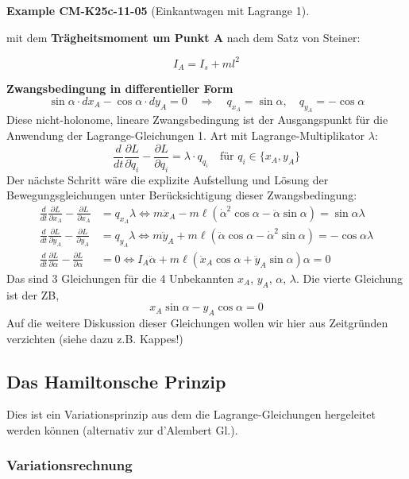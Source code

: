 \documentclass[10pt, letterpaper]{article}
\newcommand{\CustomHeading}[3]{%
  \par\medskip\noindent%
  \textbf{#1 #2} \textnormal{(#3)}.\enskip%
}
\newenvironment{EXA}[2]{\begin{unitbox}\CustomHeading{Example}{#1}{#2}}{\end{unitbox}}
\begin{document}
\begin{EXA}{CM-K25c-11-05}{Einkantwagen mit Lagrange 1}
mit dem \textbf{Trägheitsmoment um Punkt A} nach dem Satz von Steiner:

\[
I_A = I_s + m l^2
\]

\textbf{Zwangsbedingung in differentieller Form}
\[
\sin\alpha \cdot dx_A - \cos\alpha \cdot dy_A = 0
\quad \Rightarrow \quad
q_{x_A} = \sin\alpha, \quad q_{y_A} = -\cos\alpha
\]
Diese nicht-holonome, lineare Zwangsbedingung ist der Ausgangspunkt für die Anwendung der Lagrange-Gleichungen 1. Art mit Lagrange-Multiplikator \( \lambda \):
\[
\frac{d}{dt} \frac{\partial L}{\partial \dot{q}_i} - \frac{\partial L}{\partial q_i} = \lambda \cdot q_{q_i}
\quad \text{für } q_i \in \{x_A, y_A\}
\]
Der nächste Schritt wäre die explizite Aufstellung und Lösung der Bewegungsgleichungen unter Berücksichtigung dieser Zwangsbedingung:
\begin{align*}
\frac{d}{dt}\frac{\partial L}{\partial x_A} - \frac{\partial L}{\partial x_A} &= q_{x_A}\lambda \Leftrightarrow m\ddot{x}_A - m\ell(\dot{\alpha}^2\cos\alpha - \ddot{\alpha}\sin\alpha) = \sin\alpha\lambda \\
\frac{d}{dt}\frac{\partial L}{\partial y_A} - \frac{\partial L}{\partial y_A} &= q_{y_A}\lambda \Leftrightarrow m\ddot{y}_A + m\ell(\ddot{\alpha}\cos\alpha - \dot{\alpha}^2\sin\alpha) = -\cos\alpha\lambda \\
\frac{d}{dt}\frac{\partial L}{\partial \alpha} - \frac{\partial L}{\partial \alpha} &= 0 \Leftrightarrow I_A\ddot{\alpha} + m\ell(\ddot{x}_A\cos\alpha + \ddot{y}_A\sin\alpha)\alpha = 0
\end{align*}
Das sind 3 Gleichungen für die 4 Unbekannten $x_A$, $y_A$, $\alpha$, $\lambda$. Die vierte Gleichung ist der ZB, 
$$x_A \sin\alpha - y_A \cos\alpha = 0$$
Auf die weitere Diskussion dieser Gleichungen wollen wir hier aus Zeitgründen verzichten (siehe dazu z.B. Kappes!)
\end{EXA}




\pagebreak


\subsection{Das Hamiltonsche Prinzip}

Dies ist ein Variationsprinzip aus dem die Lagrange-Gleichungen hergeleitet werden können (alternativ zur d'Alembert Gl.).



\subsubsection{Variationsrechnung}
\end{document}
